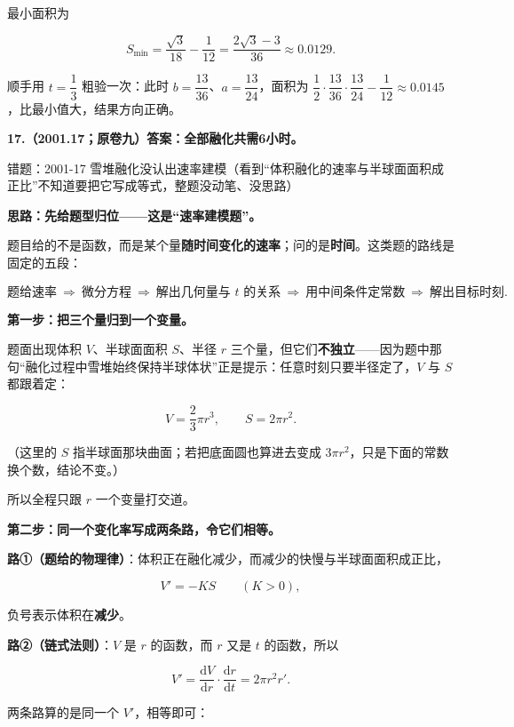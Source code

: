 \documentclass[UTF8,11pt,fontset=windows]{ctexart}
\begin{document}
最小面积为

$$
S_{\min}=\frac{\sqrt3}{18}-\frac1{12}=\frac{2\sqrt3-3}{36}\approx0.0129.
$$

顺手用 $t=\dfrac13$ 粗验一次：此时 $b=\dfrac{13}{36}$、$a=\dfrac{13}{24}$，面积为 $\dfrac12\cdot\dfrac{13}{36}\cdot\dfrac{13}{24}-\dfrac1{12}\approx0.0145$，比最小值大，结果方向正确。

\clearpage

\textbf{17.（2001.17；原卷九）答案：全部融化共需6小时。}

\begingroup\color{gray}错题：2001-17 雪堆融化没认出速率建模（看到“体积融化的速率与半球面面积成正比”不知道要把它写成等式，整题没动笔、没思路）\par\endgroup

\textbf{思路：先给题型归位——这是“速率建模题”。}

题目给的不是函数，而是某个量\textbf{随时间变化的速率}；问的是\textbf{时间}。这类题的路线是固定的五段：

$$
\text{题给速率}\ \Longrightarrow\ \text{微分方程}\ \Longrightarrow\ \text{解出几何量与 }t\text{ 的关系}
\ \Longrightarrow\ \text{用中间条件定常数}\ \Longrightarrow\ \text{解出目标时刻}.
$$

\textbf{第一步：把三个量归到一个变量。}

题面出现体积 $V$、半球面面积 $S$、半径 $r$ 三个量，但它们\textbf{不独立}——因为题中那句“融化过程中雪堆始终保持半球体状”正是提示：任意时刻只要半径定了，$V$ 与 $S$ 都跟着定：

$$
V=\frac23\pi r^3,\qquad S=2\pi r^2.
$$

（这里的 $S$ 指半球面那块曲面；若把底面圆也算进去变成 $3\pi r^2$，只是下面的常数换个数，结论不变。）

所以全程只跟 $r$ 一个变量打交道。

\textbf{第二步：同一个变化率写成两条路，令它们相等。}

\textbf{路①（题给的物理律）}：体积正在融化减少，而减少的快慢与半球面面积成正比，

$$
V'=-KS\qquad(K>0),
$$

负号表示体积在\textbf{减少}。

\textbf{路②（链式法则）}：$V$ 是 $r$ 的函数，而 $r$ 又是 $t$ 的函数，所以

$$
V'=\frac{\mathrm dV}{\mathrm dr}\cdot\frac{\mathrm dr}{\mathrm dt}=2\pi r^2r'.
$$

两条路算的是同一个 $V'$，相等即可：
\end{document}
